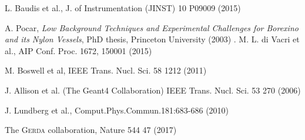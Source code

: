 \documentclass[twocolumn,epjc3]{svjour3}
\newcommand{\Gerda} {{\textsc{Gerda}\xspace}}
\begin{document}
\begin{thebibliography}{}
 L. Baudis et al., J. of Instrumentation (JINST) 10 P09009 (2015)

 A. Pocar, \textit{Low Background Techniques and Experimental Challenges for Borexino and its Nylon Vessels}, PhD thesis, Princeton University (2003)
.
 M. L. di Vacri et al., AIP Conf. Proc. 1672, 150001 (2015)

 M. Boswell et al, IEEE Trans. Nucl. Sci. 58 1212 (2011)

 J. Allison et al. (The Geant4 Collaboration) IEEE Trans. Nucl. Sci. 53 270 (2006)

 J. Lundberg et al., Comput.Phys.Commun.181:683-686 (2010)

 The \Gerda{} collaboration, Nature 544 47 (2017) 

\end{thebibliography}

\end{document}
